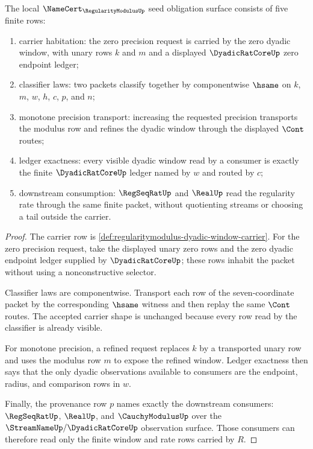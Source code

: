 \begin{theorem}
\label{thm:regularitymodulus-namecert-seed-obligation-surface}
The local $\NameCert_{\RegularityModulusUp}$ seed obligation surface consists
of five finite rows:
\begin{enumerate}
\item carrier habitation: the zero precision request is carried by the zero
  dyadic window, with unary rows $k$ and $m$ and a displayed
  $\DyadicRatCoreUp$ zero endpoint ledger;
\item classifier laws: two packets classify together by componentwise
  $\hsame$ on $k$, $m$, $w$, $h$, $c$, $p$, and $n$;
\item monotone precision transport: increasing the requested precision
  transports the modulus row and refines the dyadic window through the
  displayed $\Cont$ routes;
\item ledger exactness: every visible dyadic window read by a consumer is
  exactly the finite $\DyadicRatCoreUp$ ledger named by $w$ and routed by $c$;
\item downstream consumption: $\RegSeqRatUp$ and $\RealUp$ read the regularity
  rate through the same finite packet, without quotienting streams or choosing
  a tail outside the carrier.
\end{enumerate}
\end{theorem}
\begin{proof}
The carrier row is \autoref{def:regularitymodulus-dyadic-window-carrier}.
For the zero precision request, take the displayed unary zero rows and the
zero dyadic endpoint ledger supplied by $\DyadicRatCoreUp$; these rows inhabit
the packet without using a nonconstructive selector.

Classifier laws are componentwise. Transport each row of the seven-coordinate
packet by the corresponding $\hsame$ witness and then replay the same
$\Cont$ routes. The accepted carrier shape is unchanged because every row
read by the classifier is already visible.

For monotone precision, a refined request replaces $k$ by a transported unary
row and uses the modulus row $m$ to expose the refined window. Ledger exactness
then says that the only dyadic observations available to consumers are the
endpoint, radius, and comparison rows in $w$.

Finally, the provenance row $p$ names exactly the downstream consumers:
$\RegSeqRatUp$, $\RealUp$, and $\CauchyModulusUp$ over the
$\StreamNameUp/\DyadicRatCoreUp$ observation surface. Those consumers can
therefore read only the finite window and rate rows carried by $R$.
\end{proof}

